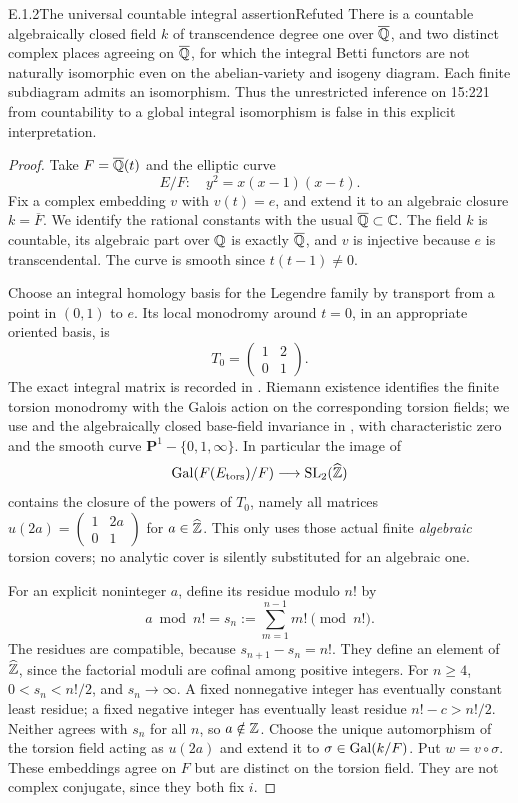 \begin{result}{E.1.2}{The universal countable integral assertion}{Refuted}
There is a countable algebraically closed field $k$ of transcendence degree one over $\overline{\mathbb Q}$, and two distinct complex places agreeing on $\overline{\mathbb Q}$, for which the integral Betti functors are not naturally isomorphic even on the abelian-variety and isogeny diagram. Each finite subdiagram admits an isomorphism. Thus the unrestricted inference on 15:221 from countability to a global integral isomorphism is false in this explicit interpretation.
\end{result}
\begin{proof}
Take $F=\overline{\mathbb Q}(t)$ and the elliptic curve
\[
 E/F:\quad y^2=x(x-1)(x-t).
\]
Fix a complex embedding $v$ with $v(t)=e$, and extend it to an algebraic closure $k=\overline F$. We identify the rational constants with the usual $\overline{\mathbb Q}\subset\mathbb C$. The field $k$ is countable, its algebraic part over $\mathbb Q$ is exactly $\overline{\mathbb Q}$, and $v$ is injective because $e$ is transcendental. The curve is smooth since $t(t-1)\ne0$.

Choose an integral homology basis for the Legendre family by transport from a point in $(0,1)$ to $e$. Its local monodromy around $t=0$, in an appropriate oriented basis, is
\[
 T_0=\begin{pmatrix}1&2\\0&1\end{pmatrix}.
\]
The exact integral matrix is recorded in \cite[Example 5.2, pp.~16--17]{OSU2024}. Riemann existence identifies the finite torsion monodromy with the Galois action on the corresponding torsion fields; we use \cite[Corollary 3.7]{OSU2024} and the algebraically closed base-field invariance in \cite[Theorem 1.1]{Landesman2024}, with characteristic zero and the smooth curve $\mathbf P^1-\{0,1,\infty\}$. In particular the image of
\[
 \operatorname{Gal}(F(E_{\mathrm{tors}})/F)\longrightarrow\operatorname{SL}_2(\widehat{\mathbb Z})
\]
contains the closure of the powers of $T_0$, namely all matrices $u(2a)=\left(\begin{smallmatrix}1&2a\\0&1\end{smallmatrix}\right)$ for $a\in\widehat{\mathbb Z}$. This only uses those actual finite \emph{algebraic} torsion covers; no analytic cover is silently substituted for an algebraic one.

For an explicit noninteger $a$, define its residue modulo $n!$ by
\[
 a\bmod n!=s_n:=\sum_{m=1}^{n-1}m!\pmod {n!}.
\]
The residues are compatible, because $s_{n+1}-s_n=n!$. They define an element of $\widehat{\mathbb Z}$, since the factorial moduli are cofinal among positive integers. For $n\ge4$, $0<s_n<n!/2$, and $s_n\to\infty$. A fixed nonnegative integer has eventually constant least residue; a fixed negative integer has eventually least residue $n!-c>n!/2$. Neither agrees with $s_n$ for all $n$, so $a\notin\mathbb Z$. Choose the unique automorphism of the torsion field acting as $u(2a)$ and extend it to $\sigma\in\operatorname{Gal}(k/F)$. Put $w=v\circ\sigma$. These embeddings agree on $F$ but are distinct on the torsion field. They are not complex conjugate, since they both fix $i$.


\end{proof}
